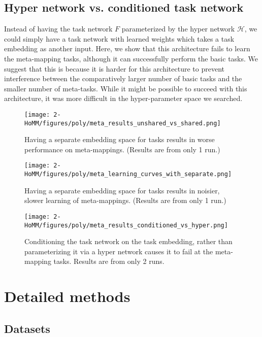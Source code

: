 \subsection{Hyper network vs. conditioned task network} \label{app_lesion_results_hyper}
Instead of having the task network $F$ parameterized by the hyper network $\mathcal{H}$, we could simply have a task network with learned weights which takes a task embedding as another input. Here, we show that this architecture fails to learn the meta-mapping tasks, although it can successfully perform the basic tasks. We suggest that this is because it is harder for this architecture to prevent interference between the comparatively larger number of basic tasks and the smaller number of meta-tasks. While it might be possible to succeed with this architecture, it was more difficult in the hyper-parameter space we searched.\par 
\begin{figure}[H]
\centering
\texttt{[image: 2-HoMM/figures/poly/meta\_results\_unshared\_vs\_shared.png]}
\caption{Having a separate embedding space for tasks results in worse performance on meta-mappings. (Results are from only 1 run.)}
\label{supp_lesion_shared_z_fig}
\end{figure}
\begin{figure}[H]
\centering
\texttt{[image: 2-HoMM/figures/poly/meta\_learning\_curves\_with\_separate.png]}
\caption{Having a separate embedding space for tasks results in noisier, slower learning of meta-mappings. (Results are from only 1 run.)}
\label{supp_lesion_shared_z_learn_fig}
\end{figure}
\begin{figure}[H]
\centering
\texttt{[image: 2-HoMM/figures/poly/meta\_results\_conditioned\_vs\_hyper.png]}
\caption{Conditioning the task network on the task embedding, rather than parameterizing it via a hyper network causes it to fail at the meta-mapping tasks. Results are from only 2 runs.}
\label{supp_lesion_hyper}
\end{figure}

\section{Detailed methods} \label{app_detailed_methods}
\subsection{Datasets}
